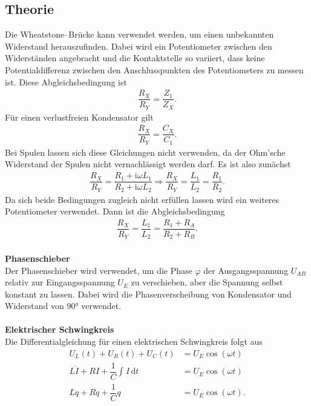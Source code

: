 \documentclass[a4paper,12pt]{article}
\newcommand{\td}{\,\text{d}}
\numberwithin{equation}{section}
\begin{document}
\subsection{Theorie}
Die Wheatstone--Brücke kann verwendet werden, um einen unbekannten Widerstand herauszufinden. Dabei wird ein Potentiometer zwischen den Widerständen angebracht und die Kontaktstelle so variiert, dass keine Potentialdifferenz zwischen den Anschlusspunkten des Potentiometers zu messen ist. Diese Abgleichsbedingung ist
\begin{align} 
        \dfrac{R_X}{R_Y}=\dfrac{Z_1}{Z_X}
.\end{align} 
Für einen verlustfreien Kondensator gilt
\begin{align} 
        \dfrac{R_X}{R_Y}=\dfrac{C_X}{C_1}
.\end{align} 
Bei Spulen lassen sich diese Gleichungen nicht verwenden, da der Ohm'sche Widerstand der Spulen nicht vernachlässigt werden darf. Es ist also zunächst
\begin{align} 
        \dfrac{R_X}{R_Y}=\dfrac{R_1+\text{i}\omega L_1}{R_2+\text{i}\omega L_2}\Rightarrow \dfrac{R_X}{R_Y}=\dfrac{L_1}{L_2}=\dfrac{R_1}{R_2}
.\end{align} 
Da sich beide Bedingungen zugleich nicht erfüllen lassen wird ein weiteres Potentiometer verwendet. Dann ist die Abgleichsbedingung
\begin{align} 
        \dfrac{R_X}{R_Y}=\dfrac{L_1}{L_2}=\dfrac{R_1+R_A}{R_2+R_B}
.\end{align} 
\hfill\\\textbf{Phasenschieber}\\ 
Der Phasenschieber wird verwendet, um die Phase $\varphi $ der Ausgangsspannung $U_{AB}$ relativ zur Eingangsspannung $U_E$ zu verschieben, aber die Spannung selbst konstant zu lassen. Dabei wird die Phasenverscheibung von Kondensator und Widerstand von $\ang{90}$ verwendet.
\\\hfill\\\textbf{Elektrischer Schwingkreis}\\ 
Die Differentialgleichung für einen elektrischen Schwingkreis folgt aus
\begin{align} 
        U_L\left(t\right)+U_R\left(t\right)+U_C\left(t\right)&=U_E\cos \left(\omega t\right)\\
        L\dot{I}+RI+\dfrac{1}{C}\int_{}^{}I\td t&=U_E\cos \left(\omega t\right)\\
        L\ddot{q}+R\dot{q}+\dfrac{1}{C}q&=U_E\cos \left(\omega t\right)
.\end{align} 
\end{document}
